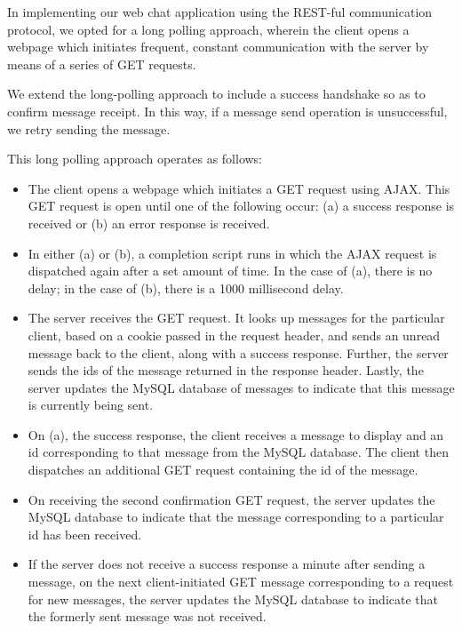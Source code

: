 \documentclass[11pt]{article} %
\begin{document}
 In implementing our web chat application using the REST-ful communication protocol, we opted for a long polling approach, wherein the client opens a webpage which initiates frequent, constant communication with the server by means of a series of GET requests. 
 
We extend the long-polling approach to include a success handshake so as to confirm message receipt. In this way, if a message send operation is unsuccessful, we retry sending the message.


 This long polling approach operates as follows: 

\begin{itemize}
\item The client opens a webpage which initiates a GET request using AJAX. This GET request is open until one of the following occur: (a) a success response is received or (b) an error response is received. 
\item In either (a) or (b), a completion script runs in which the AJAX request is dispatched again after a set amount of time. In the case of (a), there is no delay; in the case of (b), there is a 1000 millisecond delay. 
\item The server receives the GET request. It looks up messages for the particular client, based on a cookie passed in the request header, and sends an unread message back to the client, along with a success response. Further, the server sends the ids of the message returned in the response header. Lastly, the server updates the MySQL database of messages to indicate that this message is currently being sent. 
\item On (a), the success response, the client receives a message to display and an id corresponding to that message from the MySQL database. The client then dispatches an additional GET request containing the id of the message. 
\item On receiving the second confirmation GET request, the server updates the MySQL database to indicate that the message corresponding to a particular id has been received. 
\item If the server does not receive a success response a minute after sending a message, on the next client-initiated GET message corresponding to a request for new messages, the server updates the MySQL database to indicate that the formerly sent message was not received. 
\end{itemize} 
\end{document}
